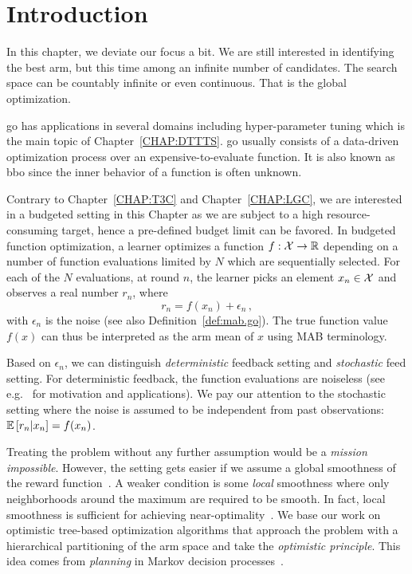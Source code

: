 \section{Introduction}\label{sec:gpo.intro}

In this chapter, we deviate our focus a bit. We are still interested in identifying the best arm, but this time among an infinite number of candidates. The search space can be countably infinite or even continuous. That is the global optimization. 

\gls{go} has applications in several domains including hyper-parameter tuning \citep{jamieson2016hyperband, li2017hyperband,samothrakis2013} which is the main topic of Chapter~\ref{CHAP:DTTTS}. \gls{go} usually consists of a data-driven optimization process over an expensive-to-evaluate function. It is also known as \gls{bbo} since the inner behavior of a function is often unknown.

Contrary to Chapter~\ref{CHAP:T3C} and Chapter~\ref{CHAP:LGC}, we are interested in a budgeted setting in this Chapter as we are subject to a high resource-consuming target, hence a pre-defined budget limit can be favored. In budgeted function optimization, a learner optimizes a function $f: \mathcal{X} \rightarrow \mathbb{R}$ depending on a number of function evaluations limited by $N$ which are sequentially selected. For each of the $N$ evaluations, at round $n$, the learner
picks an element $x_n\in\mathcal{X}$ and observes a real number $r_n$, where 
\[
    r_n = f(x_n) + \epsilon_n\,,
\]
with $\epsilon_n$ is the noise (see also Definition~\ref{def:mab.go}). The true function value $f(x)$ can thus be interpreted as the arm mean of $x$ using MAB terminology. 

Based on $\epsilon_n$, we can distinguish \emph{deterministic} feedback setting and \emph{stochastic} feed setting. For deterministic feedback, the function evaluations are noiseless (see e.g.~\citealt{defreitas2012gp} for motivation and applications). We pay our attention to the stochastic setting where the noise is assumed to be independent from past observations: $\mathbb{E}\left[r_n|x_n\right] = f(x_n)$.

Treating the problem without any further assumption would be a \emph{mission impossible}. However, the setting gets easier if we assume a global smoothness of the reward function~\citep{agrawal1995continuum,kleinberg2004nearly,kleinberg2008multi,cope2009,auer2007improved,slivkins2011taxonomy,kleinberg2013}. A weaker condition is some \emph{local} smoothness where only neighborhoods around the maximum are required to be smooth.  In fact, local smoothness is sufficient for achieving near-optimality~\citep{valko2013stosoo,azar2014online,grill2015poo,bull2015adaptive}.
We base our work on optimistic tree-based optimization algorithms \citep{munos2011soo,valko2013stosoo,preux2014bandits,azar2014online} that approach the problem with a hierarchical partitioning of the arm space and take the \textit{optimistic principle}. This idea comes from \textit{planning} in Markov decision processes~\citep{kocsis2006bandit,munos2014,grill2016trail}.

